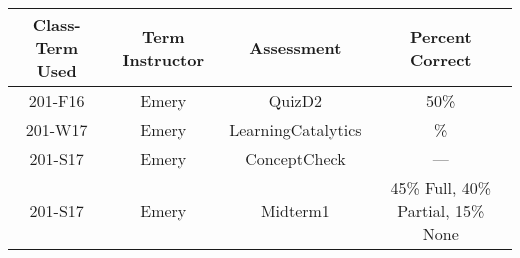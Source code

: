 \begin{outcomes}
	\begin{center}
		\begin{tabular}{cccc}
			\hline\hline
			Class-Term Used & Term Instructor & Assessment & Percent Correct\\
			\hline
			 201-F16 & Emery & QuizD2 & 50\%\\    %
			 201-W17 & Emery & LearningCatalytics & \%\\    %
			 201-S17 & Emery & ConceptCheck & ---\\    %
			 201-S17 & Emery & Midterm1 & 45\% Full, 40\% Partial, 15\% None\\    %
			\hline
		\end{tabular}
	\end{center}
\end{outcomes}

\begin{comments}


	
\end{comments}